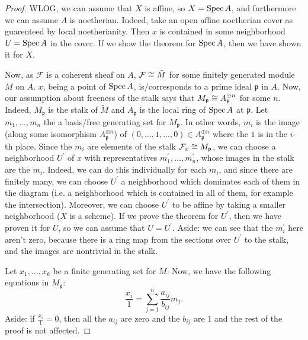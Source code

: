 \begin{proof}
	WLOG, we can assume that \(X\) is affine, so 
	\(X = \operatorname{Spec} A\), and furthermore we can assume
	\(A\) is noetherian.
	Indeed, take an open affine noetherian cover 
	as guarenteed by local noetherianity. 
	Then \(x\) is contained in some neighborhood
	\(U = \operatorname{Spec} A\) in the cover. 
	If we show the theorem for \(\operatorname{Spec} A\),
	then we have shown it for \(X\).

	Now, as \(\mathcal{F}\) is a coherent sheaf on 
	\(A\), \(\mathcal{F} \cong \tilde{M}\) for some
	finitely generated module \(M\) on \(A\).
	\(x\), being a point of \(\operatorname{Spec} A\), 
	is/corresponds to a prime
	ideal \(\mathfrak{p}\) in \(A\).
	Now, our assumption about
	freeness of the stalk says that
	\(M_{\mathfrak{p}} \cong A_{\mathfrak{p}}^{\oplus n}\) 
	for some \(n\).
	Indeed, \(M_{\mathfrak{p}}\) is the stalk of 
	\(\tilde{M}\) and \(A_{\mathfrak{p}}\) is the local
	ring of \(\operatorname{Spec} A\) at \(\mathfrak{p}\).
	Let \(m_{1} , \ldots , m_{n}\) the a 
	basis/free generating set for \(M_{\mathfrak{p}}\).
	In other words, \(m_{i}\) is the image 
	(along
	some isomorphism \(A_{\mathfrak{p}}^{\oplus n}\)) of
	\((0, \ldots, 1, \ldots, 0) \in A_{\mathfrak{p}}^{\oplus n}\)
	where the \(1\) is in the \(i\)-th place.
	Since the \(m_{i}\) are elements of the stalk 
	\(\mathcal{F}_{x} \cong M_{\mathfrak{p}}\),
	we can choose a neighborhood \(U^{\prime}\) of \(x\) with 
	representatives \(m_{1}^{\prime}, \ldots, m_{n}^{\prime}\),
	whose images in the stalk are the \(m_{i}\).
	Indeed, we can do this individually for each \(m_{i}\),
	and since there are finitely many, 
	we can choose \(U^{\prime}\) a neighborhood which dominates each of them in 
	the diagram (i.e. a neighborhood which is contained in
	all of them, for example the intersection).
	Moreover, we can choose \(U^{\prime}\) to be affine by taking a 
	smaller neighborhood (\(X\) is a scheme).
	If we prove the theorem for \(U^{\prime}\), then we 
	have proven it for \(U\),
	so we can assume that \(U = U^{\prime}\).
	Aside: we can see that the \(m_{i}^{\prime}\) here aren't
	zero, because there is a ring map from the sections over
	\(U^{\prime}\) to the stalk, and the images are nontrivial in the stalk.


	Let \(x_{1}, \ldots, x_{k}\) be a finite generating set
	for \(M\).
	Now, we have the following equations in \(M_{\mathfrak{p}}\):
	\[
		\frac{x_{i}}{1} = \sum_{j=1}^{n} \frac{a_{ij}}{b_{ij}} m_{j} 
	.\] 
	Aside: if \(\frac{x_{i}}{1} = 0\), then all the \(a_{ij}\) are zero
	and the \(b_{ij}\) are \(1\) and the rest of the proof is
	not affected.


\end{proof}
